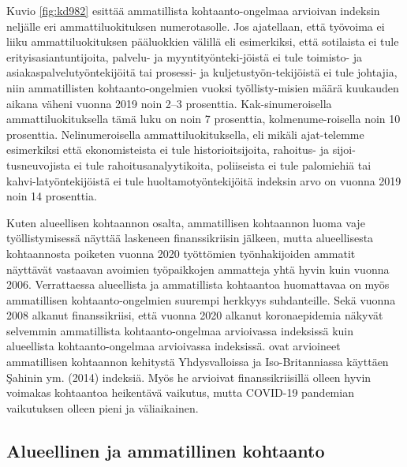 \documentclass[12pt]{article}
\begin{document}
Kuvio \ref{fig:kd982} esittää ammatillista kohtaanto-ongelmaa arvioivan indeksin neljälle eri ammattiluokituksen numerotasolle. Jos ajatellaan, että työvoima ei liiku ammattiluokituksen pääluokkien välillä eli esimerkiksi, että sotilaista ei tule erityisasiantuntijoita, palvelu- ja myyntityönteki-jöistä ei tule toimisto- ja asiakaspalvelutyöntekijöitä tai prosessi- ja kuljetustyön-tekijöistä ei tule johtajia, niin ammatillisten kohtaanto-ongelmien vuoksi työllisty-misien määrä kuukauden aikana väheni vuonna 2019 noin 2–3 prosenttia. Kak-sinumeroisella ammattiluokituksella tämä luku on noin 7 prosenttia, kolmenume-roisella noin 10 prosenttia. Nelinumeroisella ammattiluokituksella, eli mikäli ajat-telemme esimerkiksi että ekonomisteista ei tule historioitsijoita, rahoitus- ja sijoi-tusneuvojista ei tule rahoitusanalyytikoita, poliiseista ei tule palomiehiä tai kahvi-latyöntekijöistä ei tule huoltamotyöntekijöitä indeksin arvo on vuonna 2019 noin 14 prosenttia.

Kuten alueellisen kohtaannon osalta, ammatillisen kohtaannon luoma vaje työllistymisessä näyttää laskeneen finanssikriisin jälkeen, mutta alueellisesta kohtaannosta poiketen vuonna 2020 työttömien työnhakijoiden ammatit näyttävät vastaavan avoimien työpaikkojen ammatteja yhtä hyvin kuin vuonna 2006. Verrattaessa alueellista ja ammatillista kohtaantoa huomattavaa on myös ammatillisen kohtaanto-ongelmien suurempi herkkyys suhdanteille. Sekä vuonna 2008 alkanut finanssikriisi, että vuonna 2020 alkanut koronaepidemia näkyvät selvemmin ammatillista kohtaanto-ongelmaa arvioivassa indeksissä kuin alueellista kohtaanto-ongelmaa arvioivassa indeksissä.  ovat arvioineet ammatillisen kohtaannon kehitystä Yhdysvalloissa ja Iso-Britanniassa käyttäen {\c{S}}ahinin ym. (2014) indeksiä. Myös he arvioivat finanssikriisillä olleen hyvin voimakas kohtaantoa heikentävä vaikutus, mutta COVID-19 pandemian vaikutuksen olleen pieni ja väliaikainen. 


\subsection{Alueellinen ja ammatillinen kohtaanto} \label{section:alueellinen ja ammatillinen kohtaanto}
\end{document}
